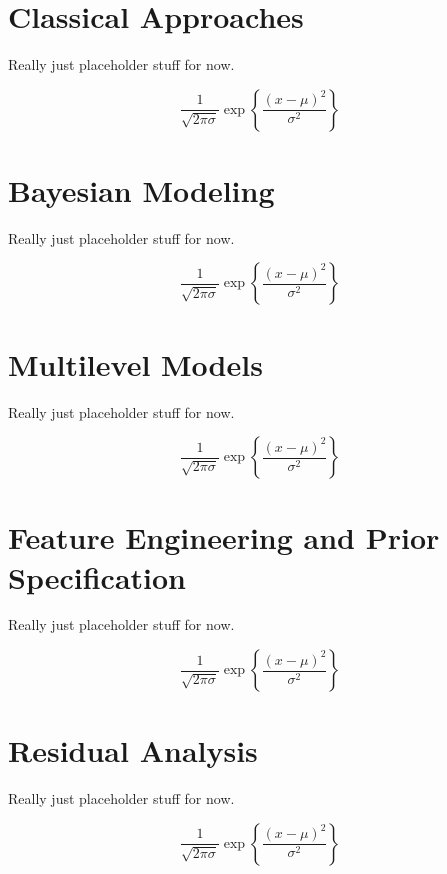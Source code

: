 \documentclass[
]{article}
\begin{document}
\hypertarget{classical-approaches}{%
\section{Classical Approaches}\label{classical-approaches}}

Really just placeholder stuff for now.

\[
\frac{1}{\sqrt{2\pi\sigma}} \exp{\left\lbrace \frac{(x-\mu)^2}{\sigma^2} \right\rbrace}
\]

\hypertarget{bayesian-modeling}{%
\section{Bayesian Modeling}\label{bayesian-modeling}}

Really just placeholder stuff for now.

\[
\frac{1}{\sqrt{2\pi\sigma}} \exp{\left\lbrace \frac{(x-\mu)^2}{\sigma^2} \right\rbrace}
\]

\hypertarget{multilevel-models}{%
\section{Multilevel Models}\label{multilevel-models}}

Really just placeholder stuff for now.

\[
\frac{1}{\sqrt{2\pi\sigma}} \exp{\left\lbrace \frac{(x-\mu)^2}{\sigma^2} \right\rbrace}
\]

\hypertarget{feature-engineering-and-prior-specification}{%
\section{Feature Engineering and Prior Specification}\label{feature-engineering-and-prior-specification}}

Really just placeholder stuff for now.

\[
\frac{1}{\sqrt{2\pi\sigma}} \exp{\left\lbrace \frac{(x-\mu)^2}{\sigma^2} \right\rbrace}
\]

\hypertarget{residual-analysis}{%
\section{Residual Analysis}\label{residual-analysis}}

Really just placeholder stuff for now.

\[
\frac{1}{\sqrt{2\pi\sigma}} \exp{\left\lbrace \frac{(x-\mu)^2}{\sigma^2} \right\rbrace}
\]
\end{document}
